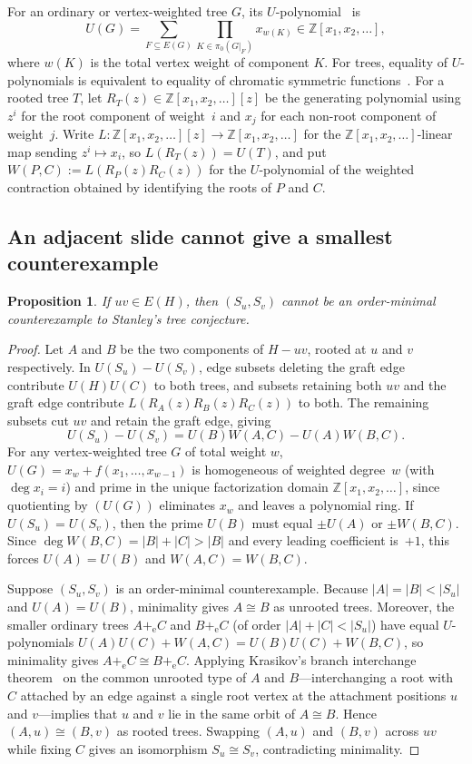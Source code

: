 \documentclass[10pt]{article}
\newtheorem{proposition}[theorem]{Proposition}
\begin{document}
For an ordinary or vertex-weighted tree $G$, its $U$-polynomial~\cite{noble-welsh} is
\[
U(G) = \sum_{F\subseteq E(G)} \prod_{K\in\pi_0(G|_F)} x_{w(K)} \in \mathbb{Z}[x_1,x_2,\ldots],
\]
where $w(K)$ is the total vertex weight of component $K$. For trees, equality of $U$-polynomials is equivalent to equality of chromatic symmetric functions~\cite{crew-spirkl}. For a rooted tree $T$, let $R_T(z)\in\mathbb{Z}[x_1,x_2,\ldots][z]$ be the generating polynomial using $z^i$ for the root component of weight~$i$ and $x_j$ for each non-root component of weight~$j$. Write $L\colon \mathbb{Z}[x_1,x_2,\ldots][z]\to\mathbb{Z}[x_1,x_2,\ldots]$ for the $\mathbb{Z}[x_1,x_2,\ldots]$-linear map sending $z^i\mapsto x_i$, so $L(R_T(z))=U(T)$, and put $W(P,C):=L(R_P(z)R_C(z))$ for the $U$-polynomial of the weighted contraction obtained by identifying the roots of $P$ and $C$.

\subsection{An adjacent slide cannot give a smallest counterexample}

\begin{proposition}\label{prop:adj-slide}
If $uv\in E(H)$, then $(S_u,S_v)$ cannot be an order-minimal counterexample to Stanley's tree conjecture.
\end{proposition}

\begin{proof}
Let $A$ and $B$ be the two components of $H-uv$, rooted at $u$ and $v$ respectively. In $U(S_u)-U(S_v)$, edge subsets deleting the graft edge contribute $U(H)U(C)$ to both trees, and subsets retaining both $uv$ and the graft edge contribute $L(R_A(z)R_B(z)R_C(z))$ to both. The remaining subsets cut $uv$ and retain the graft edge, giving
\[
U(S_u) - U(S_v) = U(B)W(A,C) - U(A)W(B,C).
\]
For any vertex-weighted tree $G$ of total weight $w$, $U(G) = x_w + f(x_1,\ldots,x_{w-1})$ is homogeneous of weighted degree~$w$ (with $\deg x_i = i$) and prime in the unique factorization domain $\mathbb{Z}[x_1,x_2,\ldots]$, since quotienting by $(U(G))$ eliminates $x_w$ and leaves a polynomial ring. If $U(S_u)=U(S_v)$, then the prime $U(B)$ must equal $\pm U(A)$ or $\pm W(B,C)$. Since $\deg W(B,C) = |B|+|C| > |B|$ and every leading coefficient is~$+1$, this forces $U(A)=U(B)$ and $W(A,C)=W(B,C)$.

Suppose $(S_u,S_v)$ is an order-minimal counterexample. Because $|A|=|B|<|S_u|$ and $U(A)=U(B)$, minimality gives $A\cong B$ as unrooted trees. Moreover, the smaller ordinary trees $A+_{\mathrm{e}} C$ and $B+_{\mathrm{e}} C$ (of order $|A|+|C|<|S_u|$) have equal $U$-polynomials $U(A)U(C)+W(A,C)=U(B)U(C)+W(B,C)$, so minimality gives $A+_{\mathrm{e}} C\cong B+_{\mathrm{e}} C$. Applying Krasikov's branch interchange theorem~\cite{krasikov} on the common unrooted type of $A$ and $B$—interchanging a root with $C$ attached by an edge against a single root vertex at the attachment positions $u$ and $v$—implies that $u$ and $v$ lie in the same orbit of $A\cong B$. Hence $(A,u)\cong (B,v)$ as rooted trees. Swapping $(A,u)$ and $(B,v)$ across $uv$ while fixing $C$ gives an isomorphism $S_u\cong S_v$, contradicting minimality.
\end{proof}
\end{document}
